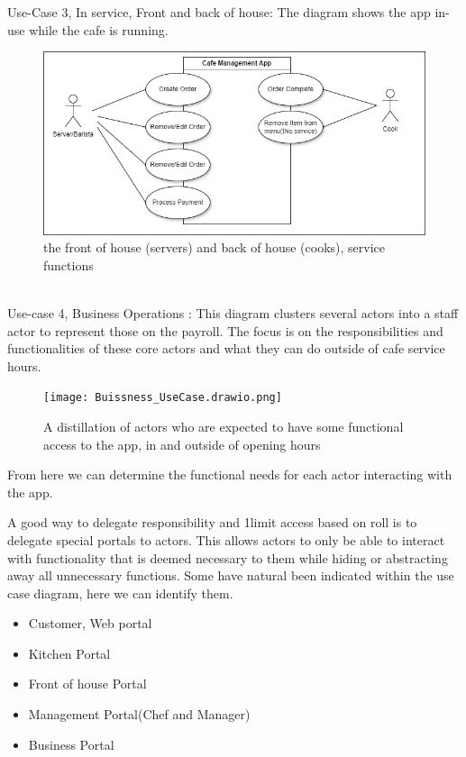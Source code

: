 \documentclass{article}
\begin{document}
Use-Case 3, In service, Front and back of house:
The diagram shows the app in-use while the cafe is running.
\\
\begin{figure}[h!]
    \centering
    \includegraphics[width=1\linewidth]{Service_UseCase.drawio (1).png}
    \caption{the front of house (servers) and back of house (cooks), service functions}
    \label{fig:enter-label}
\end{figure}
\\
Use-case 4, Business Operations :
This diagram clusters several actors into a staff actor to represent those on the payroll. The focus is on the responsibilities and functionalities of these core actors and what they can do outside of cafe service hours. 
\\
\begin{figure}[h!]
    \centering
    \texttt{[image: Buissness\_UseCase.drawio.png]}
    \caption{A distillation of actors who are expected to have some functional access to the app, in and outside of opening hours}
    \label{fig:enter-label}
\end{figure}

From here we can determine the functional needs for each actor interacting with the app.

A good way to delegate responsibility and 1limit access based on roll is to delegate special portals to actors. This allows actors to only be able to interact with functionality that is deemed necessary to them while hiding or abstracting away all unnecessary functions. Some have natural been indicated within the use case diagram, here we can identify them.
\begin{itemize}
    \item Customer, Web portal
    \item Kitchen Portal
    \item Front of house Portal
    \item Management Portal(Chef and Manager)
    \item Business Portal
\end{itemize} 
\clearpage
\end{document}
